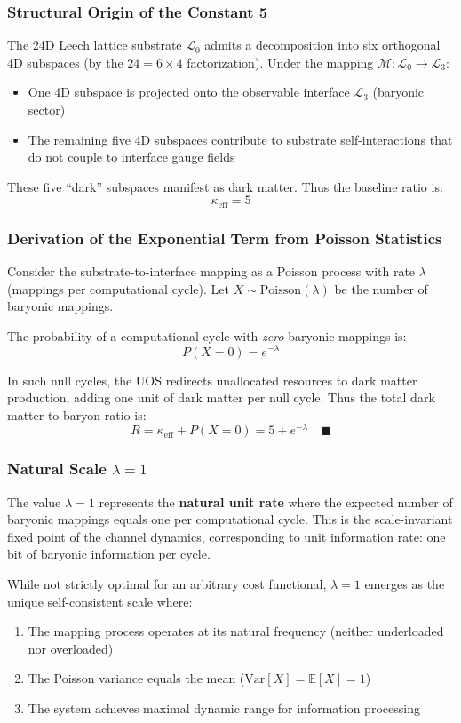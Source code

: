\documentclass[11pt,titlepage]{article}
\begin{document}
\subsubsection{Structural Origin of the Constant 5}
The 24D Leech lattice substrate $\mathcal{L}_0$ admits a decomposition into six orthogonal 4D subspaces (by the $24 = 6 \times 4$ factorization). Under the mapping $\mathcal{M}: \mathcal{L}_0 \to \mathcal{L}_3$:
\begin{itemize}
    \item One 4D subspace is projected onto the observable interface $\mathcal{L}_3$ (baryonic sector)
    \item The remaining five 4D subspaces contribute to substrate self-interactions that do not couple to interface gauge fields
\end{itemize}

These five ``dark'' subspaces manifest as dark matter. Thus the baseline ratio is:
\[
\kappa_{\text{eff}} = 5
\]

\subsubsection{Derivation of the Exponential Term from Poisson Statistics}
Consider the substrate-to-interface mapping as a Poisson process with rate $\lambda$ (mappings per computational cycle). Let $X \sim \text{Poisson}(\lambda)$ be the number of baryonic mappings.

The probability of a computational cycle with \textit{zero} baryonic mappings is:
\[
P(X = 0) = e^{-\lambda}
\]

In such null cycles, the UOS redirects unallocated resources to dark matter production, adding one unit of dark matter per null cycle. Thus the total dark matter to baryon ratio is:
\[
R = \kappa_{\text{eff}} + P(X = 0) = 5 + e^{-\lambda}
\quad \blacksquare
\]

\subsubsection{Natural Scale $\lambda = 1$}
The value $\lambda = 1$ represents the \textbf{natural unit rate} where the expected number of baryonic mappings equals one per computational cycle. This is the scale-invariant fixed point of the channel dynamics, corresponding to unit information rate: one bit of baryonic information per cycle.

While not strictly optimal for an arbitrary cost functional, $\lambda = 1$ emerges as the unique self-consistent scale where:
\begin{enumerate}
    \item The mapping process operates at its natural frequency (neither underloaded nor overloaded)
    \item The Poisson variance equals the mean ($\text{Var}[X] = \mathbb{E}[X] = 1$)
    \item The system achieves maximal dynamic range for information processing
\end{enumerate}
\end{document}
